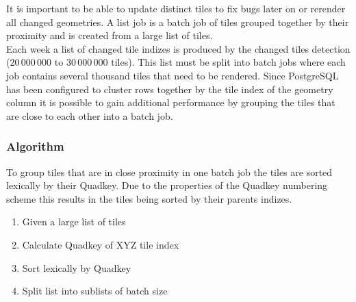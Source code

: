 \noindent\begin{minipage}[t]{0.68\linewidth}
    It is important to be able to update distinct tiles to fix bugs later on or rerender all changed geometries. A list job is a batch job of tiles grouped together by their proximity and is created from a large list of tiles.\\
    
    Each week a list of changed tile indizes is produced by the changed tiles detection ($20\,000\,000$ to $30\,000\,000$ tiles). This list must be split into batch jobs where each job contains several thousand tiles that need to be rendered. Since PostgreSQL has been configured to cluster rows together by the tile index of the geometry column it is possible to gain additional performance by grouping the tiles that are close to each other into a batch job.

    \subsubsection*{Algorithm}
    
    To group tiles that are in close proximity in one batch job the tiles are sorted lexically by their Quadkey\cite{bing_quad_key}. Due to the properties of the Quadkey numbering scheme this results in the tiles being sorted by their parents indizes.
    
    \begin{enumerate}  
        \item Given a large list of tiles
        \item Calculate Quadkey of XYZ tile index
        \item Sort lexically by Quadkey
        \item Split list into sublists of batch size
    \end{enumerate}
\end{minipage}
\hfill
